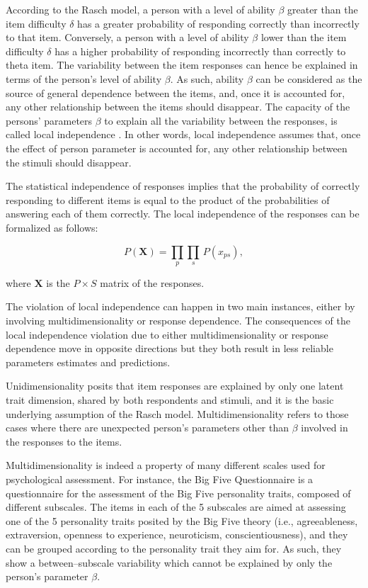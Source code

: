 \documentclass[12pt]{book}
\begin{document}
According to the Rasch model, a person with a  level of ability $\beta$ greater than the item difficulty $\delta$ has a greater probability of responding  correctly than incorrectly to that item. 
Conversely, a person with a level of ability $\beta$ lower than the item difficulty $\delta$ has a higher probability of responding incorrectly than correctly to theta item. 
The variability between the item responses can hence be explained in terms of the person's level of ability $\beta$. 
As such, ability $\beta$ can be considered as the source of general dependence between the items, and, once it is accounted for, any other relationship between the items should disappear. 
The capacity of the persons' parameters $\beta$ to explain all the variability between the responses, is called local independence \cite{andrich}.  In other words, local independence assumes that, once the effect of person parameter is accounted for, any other relationship between the stimuli should disappear.

The statistical independence of responses implies that the probability of correctly responding to different items is equal to the product of the probabilities of answering each of them correctly. The local independence of the responses can be formalized as follows: 
 
\begin{equation}\label{eq:local}
	P(\bm{X}) = \prod_p \prod_s \, P(x_{ps}),
\end{equation}

where $\bm{X}$ is the $P \times S$ matrix of the responses. 

The violation of local independence can happen in two main instances, either by involving multidimensionality or response dependence. 
The consequences of the local independence violation due to either multidimensionality or response dependence move in opposite directions but they both result in less reliable parameters estimates and predictions.
 
Unidimensionality posits that item responses are explained by only one latent trait dimension, shared by both respondents and stimuli, and it is the basic underlying assumption of the Rasch model.
Multidimensionality refers to those cases where there are unexpected person's parameters other than $\beta$ involved in the responses to the items. 

Multidimensionality is indeed a property of many different scales used for psychological assessment. For instance, the Big Five Questionnaire \cite{bigfive} is a questionnaire for the assessment of the Big Five personality traits, composed of different subscales. 
The items in each of the 5 subscales are aimed at assessing one of the 5 personality traits posited by the Big Five theory (i.e., agreeableness, extraversion, openness to experience, neuroticism, conscientiousness), and they can be grouped according to the personality trait they aim for. 
As such, they show a between--subscale variability which cannot be explained by only the person’s parameter $\beta$. 
\end{document}

